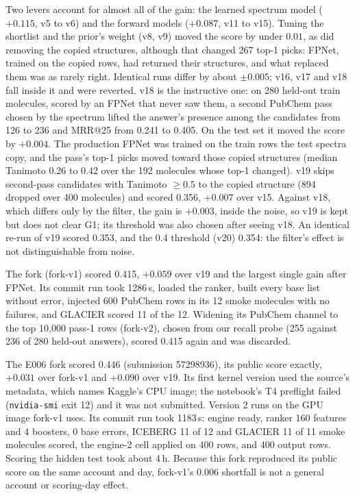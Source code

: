 \documentclass[11pt]{article}
\begin{document}
Two levers account for almost all of the gain: the learned spectrum model ($+0.115$, v5 to v6)
and the forward models ($+0.087$, v11 to v15). Tuning the shortlist and the prior's weight (v8, v9)
moved the score by under $0.01$, as did removing the copied structures, although that changed 267 top-1 picks:
FPNet, trained on the copied rows, had returned their structures, and what replaced them was as
rarely right. Identical runs differ by about $\pm 0.005$; v16, v17 and v18 fall inside it and were
reverted. v18 is the instructive one: on 280 held-out train molecules, scored by an FPNet that
never saw them, a second PubChem pass chosen by the spectrum lifted the answer's presence among
the candidates from 126 to 236 and MRR@25 from 0.241 to 0.405. On the test set it moved the score
by $+0.004$. The production FPNet was trained on the train rows the test spectra copy, and the
pass's top-1 picks moved toward those copied structures (median Tanimoto 0.26 to 0.42 over the 192
molecules whose top-1 changed). v19 skips second-pass candidates with Tanimoto $\geq 0.5$ to the
copied structure (894 dropped over 400 molecules) and scored 0.356, $+0.007$ over v15. Against v18,
which differs only by the filter, the gain is $+0.003$, inside the noise, so v19 is kept but does
not clear G1; its threshold was also chosen after seeing v18. An identical re-run of v19 scored 0.353, and the
0.4 threshold (v20) 0.354: the filter's effect is not distinguishable from noise.

The fork (fork-v1) scored 0.415, $+0.059$ over v19 and the largest single gain after FPNet. Its commit
run took 1286\,s, loaded the ranker, built every base list without error, injected 600 PubChem rows
in its 12 smoke molecules with no failures, and GLACIER scored 11 of the 12. Widening its PubChem
channel to the top 10{,}000 pass-1 rows (fork-v2), chosen from our recall probe (255 against 236 of 280
held-out answers), scored 0.415 again and was discarded.

The E006 fork scored 0.446 (submission 57298936), its public score exactly, $+0.031$ over fork-v1 and
$+0.090$ over v19. Its first kernel version used the source's metadata, which names Kaggle's CPU image;
the notebook's T4 preflight failed (\texttt{nvidia-smi} exit 12) and it was not submitted. Version 2 runs
on the GPU image fork-v1 uses. Its commit run took 1183\,s: engine ready, ranker 160 features and 4
boosters, 0 base errors, ICEBERG 11 of 12 and GLACIER 11 of 11 smoke molecules scored, the engine-2 cell
applied on 400 rows, and 400 output rows. Scoring the hidden test took about 4\,h. Because this fork
reproduced its public score on the same account and day, fork-v1's 0.006 shortfall is not a general
account or scoring-day effect.
\end{document}

